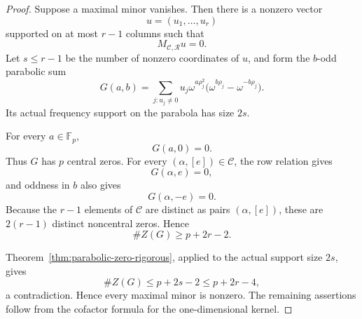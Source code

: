 \documentclass[11pt]{article}
\newcommand{\F}{\mathbb F}
\begin{document}
\begin{proof}
Suppose a maximal minor vanishes.  Then there is a nonzero vector
\[
 u=(u_1,\ldots,u_r)
\]
supported on at most \(r-1\) columns such that
\[
 M_{\mathcal C,\mathcal R}u=0.
\]
Let \(s\le r-1\) be the number of nonzero coordinates of \(u\), and
form the \(b\)-odd parabolic sum
\[
 G(a,b)
 =
 \sum_{j:u_j\ne0}
 u_j\omega^{a\rho_j^2}
 \bigl(\omega^{b\rho_j}-\omega^{-b\rho_j}\bigr).
\]
Its actual frequency support on the parabola has size \(2s\).

For every \(a\in\F_p\),
\[
 G(a,0)=0.
\]
Thus \(G\) has \(p\) central zeros.  For every
\((\alpha,[e])\in\mathcal C\), the row relation gives
\[
 G(\alpha,e)=0,
\]
and oddness in \(b\) also gives
\[
 G(\alpha,-e)=0.
\]
Because the \(r-1\) elements of \(\mathcal C\) are distinct as pairs
\((\alpha,[e])\), these are \(2(r-1)\) distinct noncentral zeros.
Hence
\[
 \#Z(G)\ge p+2r-2.
\]

Theorem~\ref{thm:parabolic-zero-rigorous}, applied to the actual support
size \(2s\), gives
\[
 \#Z(G)\le p+2s-2\le p+2r-4,
\]
a contradiction.  Hence every maximal minor is nonzero.  The remaining
assertions follow from the cofactor formula for the one-dimensional
kernel.
\end{proof}
\end{document}

